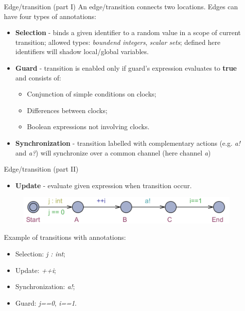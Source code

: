 \documentclass{beamer}
\begin{document}
\begin{frame}{Edge/transition (part I)}
	An edge/transition connects two locations. Edges can have four types of annotations:
	
	\begin{itemize}
		\item \textbf{Selection} - binds a given identifier to a random value in a scope of current transition; allowed types: \textit{boundend integers}, \textit{scalar sets}; defined here identifiers will shadow local/global variables.
		\item \textbf{Guard} - transition is enabled only if guard's expression evaluates to \textbf{true} and consists of:
		\begin{itemize}
			\item Conjunction of simple conditions on clocks;
			\item Differences between clocks;
			\item Boolean expressions not involving clocks.
		\end{itemize}
		\item \textbf{Synchronization} - transition labelled with complementary actions (e.g. \textit{a!} and \textit{a?}) will synchronize over a common channel (here channel \textit{a})
	\end{itemize}

\end{frame}

\begin{frame}{Edge/transition (part II)}
	\begin{itemize}
		\item \textbf{Update} - evaluate given expression when transition occur.
	\end{itemize}	
	
	\begin{figure}[H]
		\includegraphics[scale=0.8]{img/uppaal_transitions.png}
	\end{figure}
	Example of transitions with annotations:
	\begin{itemize}
		\item Selection: \textit{j : int};
		\item Update: \textit{++i};
		\item Synchronization: \textit{a!};
		\item Guard: \textit{j==0}, \textit{i==1}.
	\end{itemize}
\end{frame}
\end{document}
